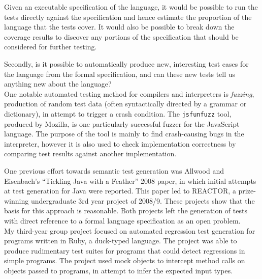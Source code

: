\documentclass[a4paper]{article}
\begin{document}
Given an executable specification of the language, it would be possible to run
the tests directly against the specification and hence estimate the proportion
of the language that the tests cover. It would also be possible to break down
the coverage results to discover any portions of the specification
that should be considered for further testing.

Secondly, is it possible to automatically produce new, interesting test cases
for the language from the formal specification, and can these new tests tell us
anything new about the language? %
\\

One notable automated testing method for compilers and interpreters is
\emph{fuzzing}, production of random test data (often syntactically directed by
a grammar or dictionary), in attempt to trigger a crash condition. The
\texttt{jsfunfuzz} tool, produced by Mozilla, is one particularly successful
fuzzer for the JavaScript language. The purpose of the tool is mainly to find
crash-causing bugs in the interpreter, however it is also used to check
implementation correctness by comparing test results against another implementation.

One previous effort towards semantic test generation was Allwood and Eisenbach's
``Tickling Java with a Feather'' 2008 paper, in which initial attempts at test
generation for Java were reported. This paper led to REACTOR, a prize-winning
undergraduate 3rd year project of 2008/9. These projects show that the basis for
this approach is reasonable. Both projects left the generation of tests with direct
reference to a formal language specification as an open problem.
\\

My third-year group project focused on automated regression test generation for
programs written in Ruby, a duck-typed language. The project was able to produce
rudimentary test suites for programs that could detect regressions in simple
programs. The project used mock objects to intercept method calls on objects
passed to programs, in attempt to infer the expected input types.
\end{document}

